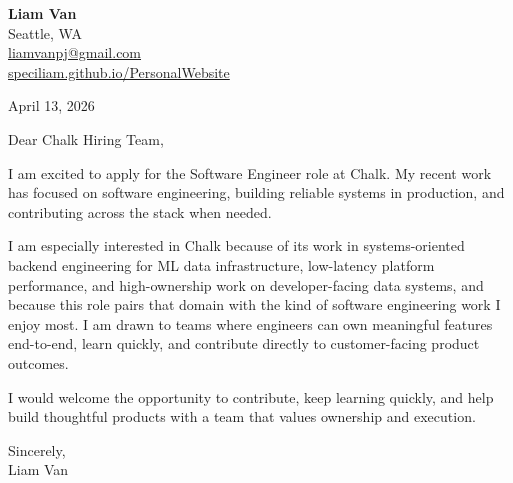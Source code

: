 \documentclass[letterpaper,11pt]{article}
\begin{document}
\begin{flushleft}
\textbf{\Large Liam Van} \\
Seattle, WA \\
\href{mailto:liamvanpj@gmail.com}{liamvanpj@gmail.com} \\
\href{https://speciliam.github.io/PersonalWebsite}{speciliam.github.io/PersonalWebsite}
\end{flushleft}

April 13, 2026

\noindent Dear Chalk Hiring Team,

\noindent I am excited to apply for the Software Engineer role at Chalk. My recent work has focused on software engineering, building reliable systems in production, and contributing across the stack when needed.

\noindent I am especially interested in Chalk because of its work in systems-oriented backend engineering for ML data infrastructure, low-latency platform performance, and high-ownership work on developer-facing data systems, and because this role pairs that domain with the kind of software engineering work I enjoy most. I am drawn to teams where engineers can own meaningful features end-to-end, learn quickly, and contribute directly to customer-facing product outcomes.

\noindent I would welcome the opportunity to contribute, keep learning quickly, and help build thoughtful products with a team that values ownership and execution.

\noindent Sincerely, \\
Liam Van
\end{document}
